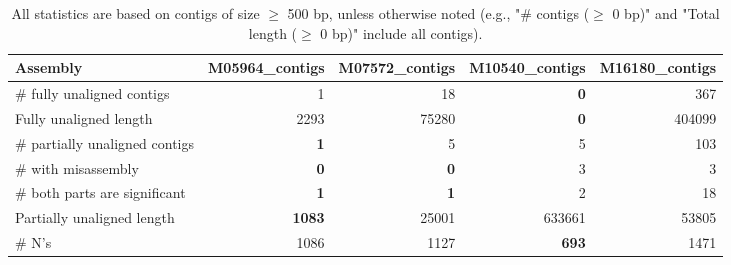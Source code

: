 \documentclass[12pt,a4paper]{article}
\begin{document}
\begin{table}[ht]
\begin{center}
\caption{All statistics are based on contigs of size $\geq$ 500 bp, unless otherwise noted (e.g., "\# contigs ($\geq$ 0 bp)" and "Total length ($\geq$ 0 bp)" include all contigs).}
\begin{tabular}{|l*{4}{|r}|}
\hline
Assembly & M05964\_contigs & M07572\_contigs & M10540\_contigs & M16180\_contigs \\ \hline
\# fully unaligned contigs & 1 & 18 & {\bf 0} & 367 \\ \hline
Fully unaligned length & 2293 & 75280 & {\bf 0} & 404099 \\ \hline
\# partially unaligned contigs & {\bf 1} & 5 & 5 & 103 \\ \hline
\hspace{5mm}\# with misassembly & {\bf 0} & {\bf 0} & 3 & 3 \\ \hline
\hspace{5mm}\# both parts are significant & {\bf 1} & {\bf 1} & 2 & 18 \\ \hline
Partially unaligned length & {\bf 1083} & 25001 & 633661 & 53805 \\ \hline
\# N's & 1086 & 1127 & {\bf 693} & 1471 \\ \hline
\end{tabular}
\end{center}
\end{table}
\end{document}
